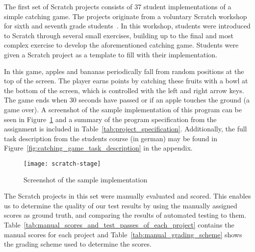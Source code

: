 The first set of Scratch projects consists of 37 student implementations of a simple catching game.
The projects originate from a voluntary Scratch workshop for sixth and seventh grade students~\cite{keller}.
In this workshop, students were introduced to Scratch through several small exercises,
building up to the final and most complex exercise to develop the aforementioned catching game.
Students were given a Scratch project as a template to fill with their implementation.
\parspace

In this game, apples and bananas periodically fall from random positions at the top of the screen.
The player earns points by catching these fruits with a bowl at the bottom of the screen,
which is controlled with the left and right arrow keys.
The game ends when 30 seconds have passed or if an apple touches the ground (a game over).
A screenshot of the sample implementation of this program can be seen in Figure~\ref{fig:screenshot_of_the_sample_implementation}
and a summary of the program specification from the assignment is included in Table~\ref{tab:project_specification}.
Additionally, the full task description from the students course (in german) may be found in Figure~\ref{fig:catching_game_task_description} in the appendix.
\parspace

\begin{figure}[htpb]
    \centering
    \texttt{[image: scratch-stage]}
    \caption{Screenshot of the sample implementation}
    \label{fig:screenshot_of_the_sample_implementation}
\end{figure}

The Scratch projects in this set were manually evaluated and scored.
This enables us to determine the quality of our test results by using the manually assigned scores as ground truth,
and comparing the results of automated testing to them.
Table~\ref{tab:manual_scores_and_test_passes_of_each_project} contains the manual scores for each project and
Table~\ref{tab:manual_grading_scheme} shows the grading scheme used to determine the scores.
\parspace

